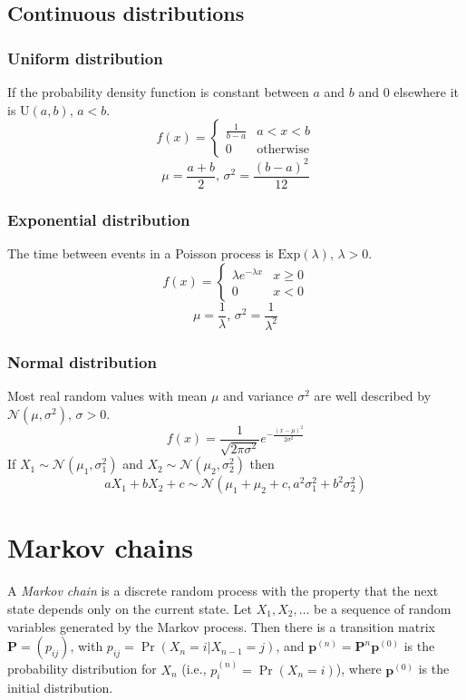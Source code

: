 \subsection{Continuous distributions}

\subsubsection{Uniform distribution}
If the probability density function is constant between $a$ and $b$ and 0 elsewhere it is $\textrm{U}(a,b),\,a<b$.
\[f(x) = \left\{
\begin{array}{cl}
\frac{1}{b-a} & a<x<b\\
0 & \textrm{otherwise}
\end{array}\right.\]
\[\mu=\frac{a+b}{2},\,\sigma^2=\frac{(b-a)^2}{12}\]

\subsubsection{Exponential distribution}
The time between events in a Poisson process is $\textrm{Exp}(\lambda),\,\lambda>0$.
\[f(x) = \left\{
\begin{array}{cl}
\lambda e^{-\lambda x} & x\geq0\\
0 & x<0
\end{array}\right.\]
\[\mu=\frac{1}{\lambda},\,\sigma^2=\frac{1}{\lambda^2}\]

\subsubsection{Normal distribution}
Most real random values with mean $\mu$ and variance $\sigma^2$ are well described by $\mathcal{N}(\mu,\sigma^2),\,\sigma>0$.
\[ f(x) = \frac{1}{\sqrt{2\pi\sigma^2}}e^{-\frac{(x-\mu)^2}{2\sigma^2}} \]
If $X_1 \sim \mathcal{N}(\mu_1,\sigma_1^2)$ and $X_2 \sim \mathcal{N}(\mu_2,\sigma_2^2)$ then
\[ aX_1 + bX_2 + c \sim \mathcal{N}(\mu_1+\mu_2+c,a^2\sigma_1^2+b^2\sigma_2^2) \]

\section{Markov chains}
A \emph{Markov chain} is a discrete random process with the property that the next state depends only on the current state.
Let $X_1,X_2,\ldots$ be a sequence of random variables generated by the Markov process.
Then there is a transition matrix $\mathbf{P} = (p_{ij})$, with $p_{ij} = \Pr(X_n = i | X_{n-1} = j)$,
and $\mathbf{p}^{(n)} = \mathbf P^n \mathbf p^{(0)}$ is the probability distribution for $X_n$ (i.e., $p^{(n)}_i = \Pr(X_n = i)$),
where $\mathbf{p}^{(0)}$ is the initial distribution.

